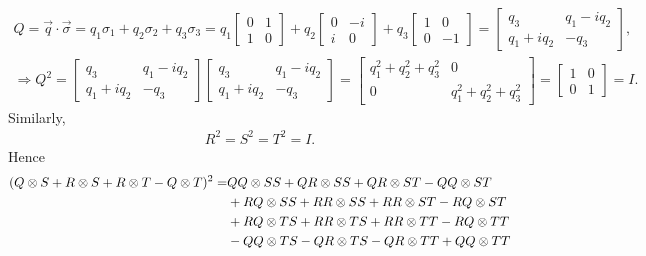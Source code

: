\documentclass[en]{sol-man}
\begin{document}
\begin{pf}
    \begin{gather}
        Q=\vec{q}\cdot\vec{\sigma}=q_1\sigma_1+q_2\sigma_2+q_3\sigma_3=q_1\begin{bmatrix}
            0&1\\
            1&0
        \end{bmatrix}+q_2\begin{bmatrix}
            0&-i\\
            i&0
        \end{bmatrix}+q_3\begin{bmatrix}
            1&0\\
            0&-1
        \end{bmatrix}=\begin{bmatrix}
            q_3&q_1-iq_2\\
            q_1+iq_2&-q_3
        \end{bmatrix},\\
        \Longrightarrow Q^2=\begin{bmatrix}
            q_3&q_1-iq_2\\
            q_1+iq_2&-q_3
        \end{bmatrix}\begin{bmatrix}
            q_3&q_1-iq_2\\
            q_1+iq_2&-q_3
        \end{bmatrix}=\begin{bmatrix}
            q_1^2+q_2^2+q_3^2&0\\
            0&q_1^2+q_2^2+q_3^2
        \end{bmatrix}=\begin{bmatrix}
            1&0\\
            0&1
        \end{bmatrix}=I.
    \end{gather}
    Similarly,
    \begin{align}
        R^2=S^2=T^2=I.
    \end{align}
    Hence
    \begin{align}
        \notag(Q\otimes S+R\otimes S+R\otimes T-Q\otimes T)^2=&QQ\otimes SS+QR\otimes SS+QR\otimes ST-QQ\otimes ST\\
        \notag&+RQ\otimes SS+RR\otimes SS+RR\otimes ST-RQ\otimes ST\\
        \notag&+RQ\otimes TS+RR\otimes TS+RR\otimes TT-RQ\otimes TT\\
        \notag&-QQ\otimes TS-QR\otimes TS-QR\otimes TT+QQ\otimes TT\\

\end{align}
\end{pf}
\end{document}
